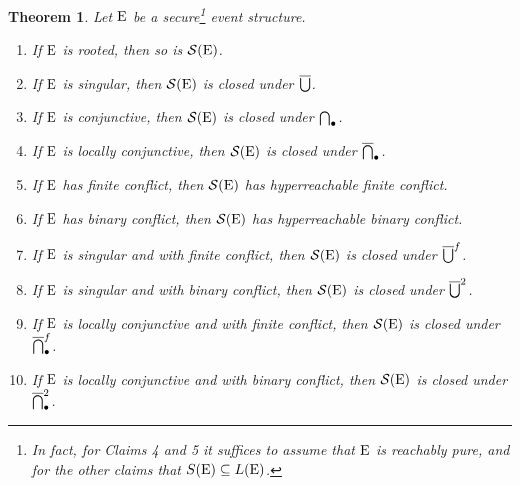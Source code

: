 \documentclass[twocolumn]{article}
\newtheorem{theo}{Theorem}
\newenvironment{theorem}[1]{\begin{theo} \rm \label{th-#1} }{\end{theo}}
\begin{document}
\begin{theorem}{EtoC-secured}
Let ${\rm E}$ be a secure\footnote{In fact, for Claims 4 and 5 it suffices
to assume that ${\rm E}$ is reachably pure, and for the other claims that
$S({\rm E}) \subseteq L({\rm E})$.} event structure.
\begin{enumerate}\parskip 0pt
\item[0.] If ${\rm E}$ is rooted, then so is ${\cal S}({\rm E})$.
\item If ${\rm E}$ is singular, then ${\cal S}({\rm E})$ is closed under $\overline{\bigcup}$.
\item If ${\rm E}$ is conjunctive, then ${\cal S}({\rm E})$ is closed under $\bigcap_{\bullet}$.
\item If ${\rm E}$ is locally conjunctive,
          then ${\cal S}({\rm E})$ is closed under $\overline{\bigcap}_{\bullet}$.
\item If ${\rm E}$ has finite conflict, then ${\cal S}({\rm E})$ has
          hyperreachable finite conflict.
\item If ${\rm E}$ has binary conflict, then ${\cal S}({\rm E})$ has
          hyperreachable binary conflict.
\item If ${\rm E}$ is singular and with finite conflict, then
          ${\cal S}({\rm E})$ is closed under $\overline{\bigcup}^f$.
\item If ${\rm E}$ is singular and with binary conflict, then
          ${\cal S}({\rm E})$ is closed under $\overline{\bigcup}^2$.
\item If ${\rm E}$ is locally conjunctive and with finite conflict,
          then ${\cal S}({\rm E})$ is closed under $\overline{\bigcap}_{\bullet}^f$.
\item If ${\rm E}$ is locally conjunctive and with binary conflict,
          then ${\cal S}({\rm E})$ is closed under $\overline{\bigcap}_{\bullet}^2$.
\end{enumerate}
\end{theorem}
\end{document}
